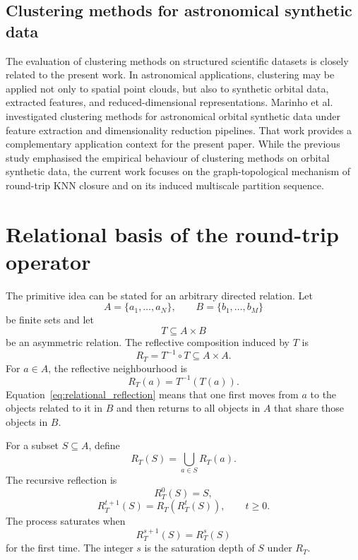 \documentclass[pdflatex,sn-mathphys-num]{sn-jnl}
\begin{document}
\subsection{Clustering methods for astronomical synthetic data}

The evaluation of clustering methods on structured scientific datasets is closely related to the present work. In astronomical applications, clustering may be applied not only to spatial point clouds, but also to synthetic orbital data, extracted features, and reduced-dimensional representations. Marinho et al.~\citep{PereiraMarinho2026ClusteringAO} investigated clustering methods for astronomical orbital synthetic data under feature extraction and dimensionality reduction pipelines. That work provides a complementary application context for the present paper. While the previous study emphasised the empirical behaviour of clustering methods on orbital synthetic data, the current work focuses on the graph-topological mechanism of round-trip KNN closure and on its induced multiscale partition sequence.

\section{Relational basis of the round-trip operator}\label{sec:relational_origin}

The primitive idea can be stated for an arbitrary directed relation. Let
\begin{equation}
A=\{a_1,\ldots,a_N\},\qquad B=\{b_1,\ldots,b_M\}
\end{equation}
be finite sets and let
\begin{equation}
T\subseteq A\times B
\end{equation}
be an asymmetric relation. The reflective composition induced by $T$ is
\begin{equation}
R_T=T^{-1}\circ T\subseteq A\times A.
\end{equation}
For $a\in A$, the reflective neighbourhood is
\begin{equation}
R_T(a)=T^{-1}(T(a)).
\label{eq:relational_reflection}
\end{equation}
Equation~\eqref{eq:relational_reflection} means that one first moves from $a$ to the objects related to it in $B$ and then returns to all objects in $A$ that share those objects in $B$.

For a subset $S\subseteq A$, define
\begin{equation}
R_T(S)=\bigcup_{a\in S}R_T(a).
\end{equation}
The recursive reflection is
\begin{equation}
R_T^0(S)=S,
\end{equation}
\begin{equation}
R_T^{t+1}(S)=R_T(R_T^t(S)),\qquad t\geq 0.
\label{eq:relational_iteration}
\end{equation}
The process saturates when
\begin{equation}
R_T^{s+1}(S)=R_T^s(S)
\end{equation}
for the first time. The integer $s$ is the saturation depth of $S$ under $R_T$.
\end{document}
